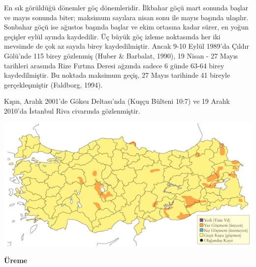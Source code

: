 \documentclass[
  a4paper,
  DIV=11,
  numbers=noendperiod]{scrreprt}
\begin{document}
En sık görüldüğü dönemler göç dönemleridir. İlkbahar göçü mart sonunda
başlar ve mayıs sonunda biter; maksimum sayılara nisan sonu ile mayıs
başında ulaşılır. Sonbahar göçü ise ağustos başında başlar ve ekim
ortasına kadar sürer, en yoğun geçişler eylül ayında kaydedilir. Üç
büyük göç izleme noktasında her iki mevsimde de çok az sayıda birey
kaydedilmiştir. Ancak 9-10 Eylül 1989'da Çıldır Gölü'nde 115 birey
gözlenmiş (Huber \& Barbalat, 1990), 19 Nisan - 27 Mayıs tarihleri
arasında Rize Fırtına Deresi ağzında sadece 6 günde 63-64 birey
kaydedilmiştir. Bu noktada maksimum geçiş, 27 Mayıs tarihinde 41 bireyle
gerçekleşmiştir (Faldborg, 1994).

Kışın, Aralık 2001'de Göksu Deltası'nda (Kuşçu Bülteni 10:7) ve 19
Aralık 2010'da İstanbul Riva civarında gözlenmiştir.

\includegraphics{images/harita_Page_105.png}

\textbf{Üreme}
\end{document}
